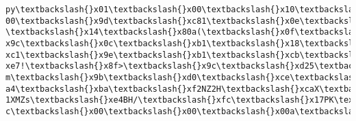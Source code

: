 \documentclass[11pt]{article}
\begin{document}
\begin{Verbatim}[commandchars=\\\{\}]
py\textbackslash{}x01\textbackslash{}x00\textbackslash{}x10\textbackslash{}x00\textbackslash{}xd1\textbackslash{}x00\textbackslash{}x00\textbackslash{}x00\textbackslash{}x00\textbackslash{}x00\textbackslash{}x00\textbackslash{}x00\textbackslash{}x90\textbackslash{}x00\textbackslash{}x00\textbackslash{}x00\textbackslash{}x00\textbackslash{}x00\textbackslash{}x00\textbackslash{}x
00\textbackslash{}x9d\textbackslash{}xc81\textbackslash{}x0e\textbackslash{}xc2 \textbackslash{}x14\textbackslash{}x80a(\textbackslash{}x0f\textbackslash{}xb0\textbackslash{}x8f\textbackslash{}x07\textbackslash{}\textbackslash{}\textbackslash{}x81\textbackslash{}rM\textbackslash{}xba8\textbackslash{}xd6\textbackslash{}x03\textbackslash{}xb8i\textbackslash{}\textbackslash{}\textbackslash{}x1c\textbackslash{}
x9c\textbackslash{}x0c\textbackslash{}xb1\textbackslash{}x18\textbackslash{}x07c\textbackslash{}rU\textbackslash{}x17\textbackslash{}xf5\textbackslash{}x14\^{}\textbackslash{}xd8z\textbackslash{}x05\textbackslash{}xff\textbackslash{}xed\textbackslash{}xff>\textbackslash{}xeb\textbackslash{}xedj\textbackslash{}xb3\textbackslash{}xe3\textbackslash{}xec\textbackslash{}
xc1\textbackslash{}x9e\textbackslash{}xb1\textbackslash{}xcb\textbackslash{}xc3\textbackslash{}xa1\textbackslash{}xc4E\textbackslash{}x88\textbackslash{}xaf\textbackslash{}xfb<6!\textbackslash{}x1e\textbackslash{}xfbr+\textbackslash{}xe9\textbackslash{}xb2\textbackslash{}xefK\textbackslash{}x97\textbackslash{}x7f\textbackslash{}xbeL\textbackslash{}
xe7!\textbackslash{}x8f>\textbackslash{}x9c\textbackslash{}xd25\textbackslash{}x8f?m\textbackslash{}x9b\textbackslash{}xd0\textbackslash{}xce\textbackslash{}x9a\textbackslash{}xf0\textbackslash{}x0e\textbackslash{}x7f\textbackslash{}x87\textbackslash{}x08\textbackslash{}x8c\textbackslash{}xa3\textbackslash{}xd3d\textbackslash{}xc0(\textbackslash{}x
a4\textbackslash{}xba\textbackslash{}xf2NZ2H\textbackslash{}xcaX\textbackslash{}xa9\textbackslash{}xc1\textbackslash{}x81\textbackslash{}x91hp\textbackslash{}xe2\textbackslash{}x90\textbackslash{}xa0\textbackslash{}x1a\textbackslash{}x15Tm+\textbackslash{}xc9\textbackslash{}x05sL\textbackslash{}xa1\%nQ\textbackslash{}x1
1XMZs\textbackslash{}xe4BH/\textbackslash{}xfc\textbackslash{}x17PK\textbackslash{}x03\textbackslash{}x04\textbackslash{}x14\textbackslash{}x00\textbackslash{}x00\textbackslash{}x00\textbackslash{}x08\textbackslash{}x00\textbackslash{}x00\textbackslash{}x00!\textbackslash{}x00\textbackslash{}x92m\textbackslash{}x9d\textbackslash{}x10
c\textbackslash{}x00\textbackslash{}x00\textbackslash{}x00a\textbackslash{}x01\textbackslash{}x00\textbackslash{}x00\textbackslash{}x08\textbackslash{}x00\textbackslash{}x14\textbackslash{}x00Pinv.npy\textbackslash{}x01\textbackslash{}x00\textbackslash{}x10\textbackslash{}x00a\textbackslash{}x01\textbackslash{}x00\textbackslash{}x00\textbackslash{}

\end{Verbatim}
\end{document}
